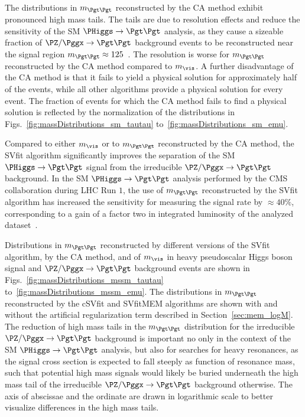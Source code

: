 The distributions in $m_{\Pgt\Pgt}$ reconstructed by the CA method exhibit pronounced high mass tails.
The tails are due to resolution effects and reduce the sensitivity of the SM $\PHiggs \to \Pgt\Pgt$ analysis,
as they cause a sizeable fraction of $\PZ/\Pggx \to \Pgt\Pgt$ background events
to be reconstructed near the signal region $m_{\Pgt\Pgt} \approx 125$~\GeV.
The resolution is worse for $m_{\Pgt\Pgt}$ reconstructed by the CA method compared to $m_{\vis}$.
A further disadvantage of the CA method is that it fails to yield a physical solution for approximately half of the events,
while all other algorithms provide a physical solution for every event.
The fraction of events for which the CA method fails to find a physical solution is reflected by the normalization of the distributions
in Figs.~\ref{fig:massDistributions_sm_tautau} to~\ref{fig:massDistributions_sm_emu}.

Compared to either $m_{\vis}$ or to $m_{\Pgt\Pgt}$ reconstructed by the CA method,
the SVfit algorithm significantly improves the separation of the SM $\PHiggs \to \Pgt\Pgt$ signal
from the irreducible $\PZ/\Pggx \to \Pgt\Pgt$ background.
In the SM $\PHiggs \to \Pgt\Pgt$ analysis performed by the CMS collaboration during LHC Run $1$,
the use of $m_{\Pgt\Pgt}$ reconstructed by the SVfit algorithm
has increased the sensitivity for measuring the signal rate by $\approx 40\%$,
corresponding to a gain of a factor two in integrated luminosity of the analyzed dataset~\cite{HIG-13-004}.

Distributions in $m_{\Pgt\Pgt}$ reconstructed by different versions of
the SVfit algorithm, by the CA method, and of $m_{\vis}$ in heavy
pseudoscalar Higgs boson signal and $\PZ/\Pggx \to \Pgt\Pgt$
background events are shown in
Figs.~\ref{fig:massDistributions_mssm_tautau}
to~\ref{fig:massDistributions_mssm_emu}.
The distributions in $m_{\Pgt\Pgt}$ reconstructed by the cSVfit and
SVfitMEM algorithms are shown with and without the artificial regularization
term described in Section~\ref{sec:mem_logM}. 
The reduction of high mass tails in the $m_{\Pgt\Pgt}$ distribution
for the irreducible $\PZ/\Pggx \to \Pgt\Pgt$
background is important no only in the context of the SM $\PHiggs \to
\Pgt\Pgt$ analysis, but also for searches for heavy resonances, as the signal cross section is expected to fall steeply as function of resonance mass,
such that potential high mass signals would likely be buried underneath the high mass tail of the irreducible $\PZ/\Pggx \to \Pgt\Pgt$ background otherwise.
The axis of abscissae and the ordinate are drawn in logarithmic scale to better visualize differences in the high mass tails.

